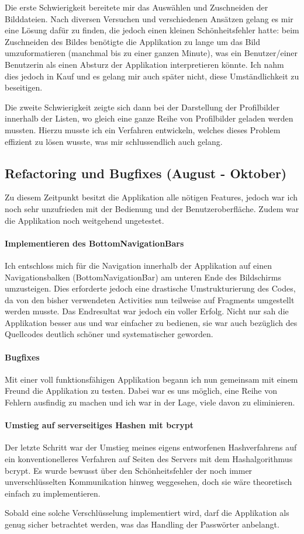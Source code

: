 \documentclass[../main.tex]{subfiles}
\begin{document}
	Die erste Schwierigkeit bereitete mir das Auswählen und Zuschneiden der Bilddateien. Nach diversen Versuchen und verschiedenen Ansätzen gelang es mir eine Lösung dafür zu finden, die jedoch einen kleinen Schönheitsfehler hatte: beim Zuschneiden des Bildes benötigte die Applikation zu lange um das Bild umzuformatieren (manchmal bis zu einer ganzen Minute), was ein Benutzer/einer Benutzerin als einen Absturz der Applikation interpretieren könnte. Ich nahm dies jedoch in Kauf und es gelang mir auch später nicht, diese Umständlichkeit zu beseitigen.
	
	Die zweite Schwierigkeit zeigte sich dann bei der Darstellung der Profilbilder innerhalb der Listen, wo gleich eine ganze Reihe von Profilbilder geladen werden mussten. Hierzu musste ich ein Verfahren entwickeln, welches dieses Problem effizient zu lösen wusste, was mir schlussendlich auch gelang.
	
	\subsection{Refactoring und Bugfixes (August - Oktober)}
	Zu diesem Zeitpunkt besitzt die Applikation alle nötigen Features, jedoch war ich noch sehr unzufrieden mit der Bedienung und der Benutzeroberfläche. Zudem war die Applikation noch weitgehend ungetestet.
	\paragraph{Implementieren des BottomNavigationBars}
	Ich entschloss mich für die Navigation innerhalb der Applikation auf einen Navigationsbalken (BottomNavigationBar) am unteren Ende des Bildschirms umzusteigen. Dies erforderte jedoch eine drastische Umstrukturierung des Codes, da von den bisher verwendeten Activities nun teilweise auf Fragments umgestellt werden musste. Das Endresultat war jedoch ein voller Erfolg. Nicht nur sah die Applikation besser aus und war einfacher zu bedienen, sie war auch bezüglich des Quellcodes deutlich schöner und systematischer geworden.
	\paragraph{Bugfixes}
	Mit einer voll funktionsfähigen Applikation begann ich nun gemeinsam mit einem Freund die Applikation zu testen. Dabei war es uns möglich, eine Reihe von Fehlern ausfindig zu machen und ich war in der Lage, viele davon zu eliminieren.
	\paragraph{Umstieg auf serverseitiges Hashen mit bcrypt}
	Der letzte Schritt war der Umstieg meines eigens entworfenen Hashverfahrens auf ein konventionelleres Verfahren auf Seiten des Servers mit dem Hashalgorithmus bcrypt. Es wurde bewusst über den Schönheitsfehler der noch immer unverschlüsselten Kommunikation hinweg weggesehen, doch sie wäre theoretisch einfach zu implementieren. 
	
	Sobald eine solche Verschlüsselung implementiert wird, darf die Applikation als genug sicher betrachtet werden, was das Handling der Passwörter anbelangt.
	
\end{document}
